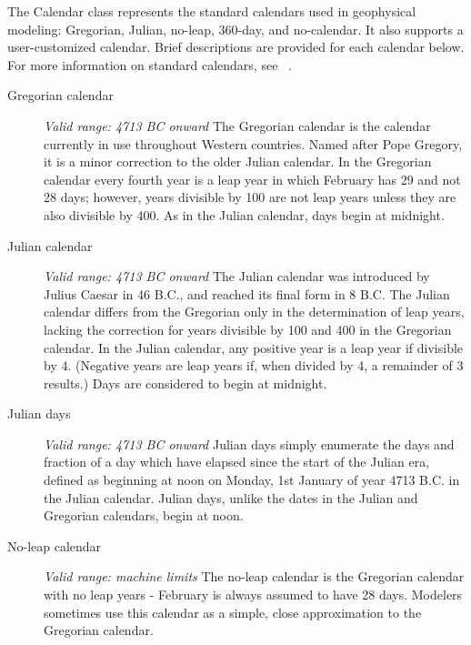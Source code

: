 
\label{sec:Calendar}
The Calendar class represents the standard calendars used in 
geophysical modeling:  Gregorian, Julian, no-leap, 360-day, and 
no-calendar.  It also supports a user-customized calendar.  Brief 
descriptions are provided for each calendar below.  For more information 
on standard calendars, see ~\cite{seidelman}.

\begin{description}            
\item[Gregorian calendar]
{\it Valid range: 4713 BC onward} \newline
The Gregorian calendar is the calendar currently in use throughout Western
countries.  Named after Pope Gregory, it is a minor 
correction to the older Julian calendar. In the Gregorian calendar every
fourth year is a leap year in which February has 29 and not 28 days;
however, years divisible by 100 are not leap years unless they are also 
divisible  by 400.  As in the Julian calendar, days begin at midnight.

\item[Julian calendar] 
{\it Valid range: 4713 BC onward} \newline
The Julian calendar was introduced by Julius Caesar in 46 B.C., and 
reached its final form in 8 B.C.  The Julian calendar differs from the 
Gregorian only in the determination of leap years, lacking the correction 
for years divisible
by 100 and 400 in the Gregorian calendar. In the Julian calendar, any positive 
year is a leap year if divisible by 4. (Negative years are leap years if, when 
divided by 4, a remainder of 3 results.) Days are considered to begin at 
midnight.

\item[Julian days]
{\it Valid range: 4713 BC onward} \newline
Julian days simply enumerate the days and fraction of a day which have elapsed 
since the start of the Julian era, defined as beginning at noon on Monday, 
1st January of year 4713 B.C. in the Julian calendar.  Julian days, 
unlike the dates in the Julian and Gregorian calendars, begin at noon.

\item[No-leap calendar]
{\it Valid range: machine limits} \newline
The no-leap calendar is the Gregorian calendar with no leap years - 
February is always assumed to have 28 days.  Modelers sometimes use this 
calendar as a simple, close approximation to the Gregorian calendar.


\end{description}

